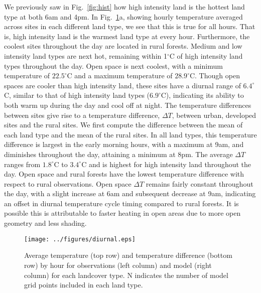 \documentclass[draft,linenumbers]{agujournal}
\begin{document}
We previously saw in Fig.~\ref{fig:hist} how high intensity land is the hottest land type at both 6am and 4pm.  In Fig.~\ref{fig:diurnal}a, showing hourly temperature averaged across sites in each different land type, we see that this is true for all hours. That is, high intensity land is the warmest land type at every hour. Furthermore, the coolest sites throughout the day are located in rural forests. 
Medium and low intensity land types are next hot, remaining within 1$^\circ$C of high intensity land types throughout the day. Open space is next coolest, with a minimum temperature of $22.5^\circ$C and a maximum temperature of $28.9^\circ$C. 
Though open spaces are cooler than high intensity land, these sites have a diurnal range of $6.4^\circ$C, similar to that of high intensity land types ($6.9^\circ$C), indicating its ability to both warm up during the day and cool off at night. 
The temperature differences between sites give rise to a temperature difference, $\Delta T$, between urban, developed sites and the rural sites. We first compute the difference between the mean of each land type and the mean of the rural sites. 
In all land types, this temperature difference is largest in the early morning hours, with a maximum at 9am, and diminishes throughout the day, attaining a minimum at 8pm. The average $\Delta T$ ranges from $1.8^\circ$C to $3.4^\circ$C
and is highest for high intensity land throughout the day. Open space and rural forests have the lowest temperature difference with respect to rural observations. Open space $\Delta T$ remains fairly constant throughout the day, with a slight increase at 6am and subsequent decrease at 9am, indicating an offset in diurnal temperature cycle timing compared to rural forests. It is possible this is attributable to faster heating in open areas due to more open geometry and less shading. 

\begin{figure}[h]
\centering
\texttt{[image: ../figures/diurnal.eps]}
\caption{Average temperature (top row) and temperature difference (bottom row) by hour for observations (left column) and model (right column) for each landcover type. N indicates the number of model grid points included in each land type. }
\label{fig:diurnal}
\end{figure}
\end{document}
